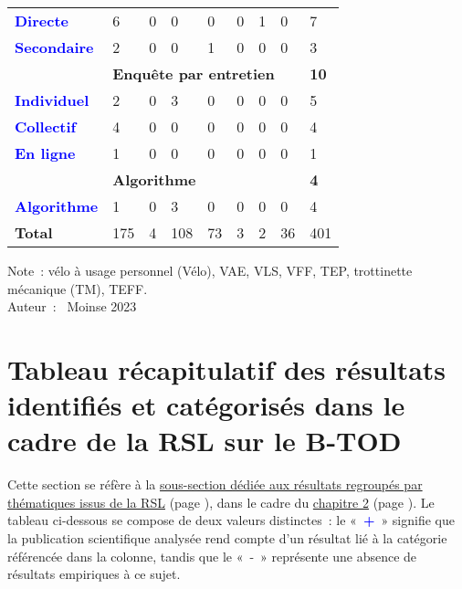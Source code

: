 \begin{table}[h]
\begin{tabular}{p{3.9cm}p{0.83cm}p{0.83cm}p{0.83cm}p{0.83cm}p{0.83cm}p{0.83cm}p{0.83cm}p{0.95cm}}
        \textcolor{blue}{\textbf{Directe}} & 6 & 0 & 0 & 0 & 0 & 1 & 0 & 7\\
        \textcolor{blue}{\textbf{Secondaire}} & 2 & 0 & 0 & 1 & 0 & 0 & 0 & 3\\
             \hline
        & \multicolumn{7}{l}{\textbf{Enquête par entretien}} & \textbf{10}\\
        \textcolor{blue}{\textbf{Individuel}} & 2 & 0 & 3 & 0 & 0 & 0 & 0 & 5\\
        \textcolor{blue}{\textbf{Collectif}} & 4 & 0 & 0 & 0 & 0 & 0 & 0 & 4\\
        \textcolor{blue}{\textbf{En ligne}} & 1 & 0 & 0 & 0 & 0 & 0 & 0 & 1\\
            \hline
        & \multicolumn{7}{l}{\textbf{Algorithme}} & \textbf{4}\\
        \textcolor{blue}{\textbf{Algorithme}} & 1 & 0 & 3 & 0 & 0 & 0 & 0 & 4\\
            \hline
        \textbf{Total} & 175 & 4 & 108 & 73 & 3 & 2 & 36 & 401\\
        \end{tabular}
    \caption*{}
    \label{Annexe RSL tableau sources de données EDP}
        \begin{flushright}
    \scriptsize
    Note~: vélo à usage personnel (Vélo), \acrfull{VAE}, \acrfull{VLS}, \acrfull{VFF}, \acrfull{TEP}, trottinette mécanique (TM), \acrfull{TEFF}.
    \\
    Auteur~: \textcopyright~Moinse 2023
        \end{flushright}
        \end{table}

    \newpage
\section{Tableau récapitulatif des résultats identifiés et catégorisés dans le cadre de la \acrshort{RSL} sur le \acrshort{B-TOD}}
    \label{donnees-ouvertes:rsl_resultats}

Cette section se réfère à la \hyperref[Caractérisation du B-TOD au prisme des caractéristiques de l'environnement urbain]{sous-section dédiée aux résultats regroupés par thématiques issus de la RSL} (page \pageref{Caractérisation du B-TOD au prisme des caractéristiques de l'environnement urbain}), dans le cadre du \hyperref[chap2:titre]{chapitre 2} (page \pageref{chap2:titre}). Le tableau ci-dessous se compose de deux valeurs distinctes~: le «~\textcolor{blue}{\textbf{+}}~» signifie que la publication scientifique analysée rend compte d'un résultat lié à la catégorie référencée dans la colonne, tandis que le «~-~» représente une absence de résultats empiriques à ce sujet.\par


